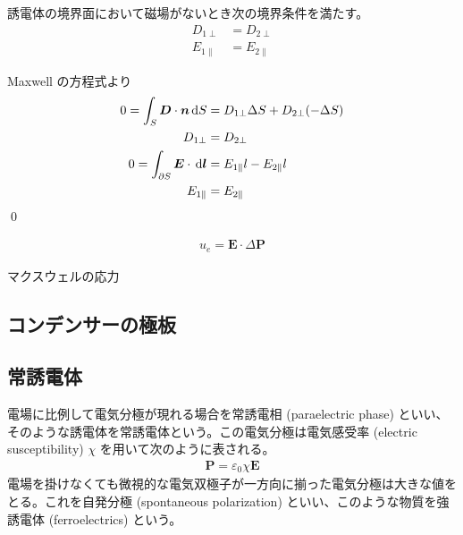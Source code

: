 \documentclass[uplatex,dvipdfmx,a4paper,11pt]{jlreq}
\makeatletter
\newcommand{\EE}{\bm{E}}
\newcommand{\DD}{\bm{D}}
\theoremstyle{definition}
\renewenvironment{proof}[1][\proofname]{\par
  \normalfont
  \topsep6\p@\@plus6\p@ \trivlist
  \item[\hskip\labelsep{\bfseries #1}\@addpunct{\bfseries}]\ignorespaces\quad\par
}{%
  \qed\endtrivlist\@endpefalse
}
\renewcommand\proofname{証明}
\makeatother
\begin{document}
\begin{theorem}[境界条件]
  誘電体の境界面において磁場がないとき次の境界条件を満たす。
  \begin{align}
    D_{1\perp}     & = D_{2\perp}     \\
    E_{1\parallel} & = E_{2\parallel}
  \end{align}
\end{theorem}
\begin{proof}
  Maxwell の方程式より
  \begin{align}
    0 = \int_S\DD\cdot\bm{n}\dl{S}           & = D_{1\perp}\Delta S + D_{2\perp}(-\Delta S) \\
    D_{1\perp}                               & = D_{2\perp}                                 \\
    0 = \int_{\partial S}\EE\cdot\dl{\bm{l}} & = E_{1\parallel}l - E_{2\parallel}l          \\
    E_{1\parallel}                           & = E_{2\parallel}
  \end{align}
\end{proof}

\begin{theorem}[誘電体のエネルギー]
  \begin{align}
    u_e = \EE\cdot\Delta \bm{P}
  \end{align}
\end{theorem}

\begin{theorem}
  マクスウェルの応力
\end{theorem}

\subsection{コンデンサーの極板}

\subsection{常誘電体}
\begin{definition}
  電場に比例して電気分極が現れる場合を常誘電相 (paraelectric phase) といい、そのような誘電体を常誘電体という。この電気分極は電気感受率 (electric susceptibility) $\chi$ を用いて次のように表される。
  \begin{align}
    \bm{P} = \varepsilon_0\chi\EE
  \end{align}
  電場を掛けなくても微視的な電気双極子が一方向に揃った電気分極は大きな値をとる。これを自発分極 (spontaneous polarization) といい、このような物質を強誘電体 (ferroelectrics) という。
\end{definition}
\end{document}
